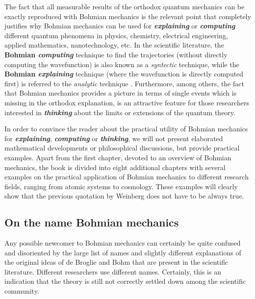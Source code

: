 \documentclass[onecolumn,nofootinbib, secnumarabic, amsmath, nobibnotes,11pt,aps,pra]{revtex4-1}
\begin{document}
The fact that all measurable results of the orthodox quantum mechanics can be exactly reproduced with Bohmian mechanics is the relevant point that completely justifies why Bohmian mechanics can be used for \textbf{\emph{explaining}} or \textbf{\emph{computing}} different quantum phenomena in physics, chemistry, electrical engineering, applied mathematics, nanotechnology, etc. In the scientific literature, the \textbf{Bohmian \emph{computing}} technique to find the trajectories (without directly computing the wavefunction) is also known as a \emph{syntectic} technique, while the \textbf{Bohmian \emph{explaining}} technique (where the wavefunction is directly computed first) is referred to the \emph{analytic} technique \cite{om.wyatt2005}. Furthermore, among others, the fact that Bohmian mechanics provides a picture in terms of single events which is missing in the orthodox explanation, is an attractive feature for those researchers interested in \textbf{\emph{thinking}} about the limits or extensions of the quantum theory.

In order to convince the reader about the practical utility of Bohmian mechanics for \textbf{\emph{explaining}}, \textbf{\emph{computing}} or \textbf{\emph{thinking}}, we will not present elaborated mathematical developments or philosophical discussions, but provide practical examples. Apart from the first chapter, devoted to an overview of Bohmian mechanics, the book is divided into eight additional chapters with several examples on the practical application of Bohmian mechanics to different research fields, ranging from atomic systems to cosmology. These examples will clearly show that the previous quotation by Weinberg does not have to be always true.


\subsection*{On the name Bohmian mechanics}

Any possible newcomer to Bohmian mechanics can certainly be quite confused and disoriented by the large list of names and slightly different explanations of the original ideas of de Broglie and Bohm that are present in the scientific literature. Different researchers use different names. Certainly, this is an indication that the theory is still not correctly settled down among the scientific community.
\end{document}
